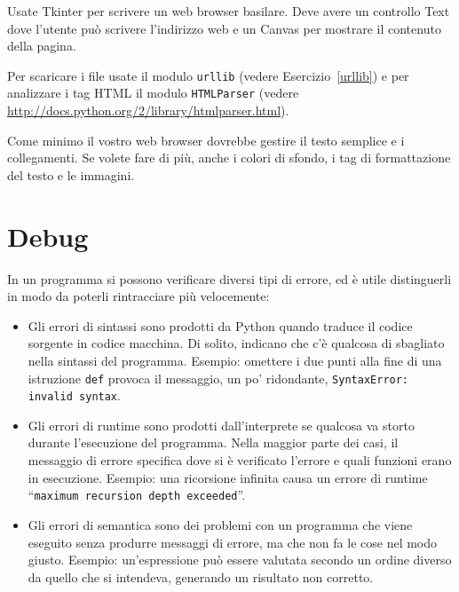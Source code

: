 \documentclass[10pt]{book}
\begin{document}
\vspace{0.2in}
\begin{exercise}

Usate Tkinter per scrivere un web browser basilare. Deve avere un controllo Text dove l'utente può scrivere l'indirizzo web e un Canvas per mostrare il contenuto della pagina.

Per scaricare i file usate il modulo {\tt urllib} (vedere Esercizio~\ref{urllib}) e per analizzare i tag HTML il modulo {\tt HTMLParser} (vedere \url{http://docs.python.org/2/library/htmlparser.html}).

Come minimo il vostro web browser dovrebbe gestire il testo semplice e i collegamenti. Se volete fare di più, anche i colori di sfondo, i tag di formattazione del testo e le immagini.


\end{exercise}



\appendix

\chapter{Debug}

In un programma si possono verificare diversi tipi di errore, ed è utile distinguerli in modo da poterli rintracciare più velocemente:

\begin{itemize}

\item Gli errori di sintassi sono prodotti da Python quando traduce il codice sorgente in codice macchina. Di solito, indicano che c'è qualcosa di sbagliato nella sintassi del programma. Esempio: omettere i due punti alla fine di una istruzione {\tt def} provoca il messaggio, un po' ridondante, {\tt SyntaxError: invalid syntax}.

\item Gli errori di runtime sono prodotti dall'interprete se qualcosa va storto durante l'esecuzione del programma. Nella maggior parte dei casi, il messaggio di errore specifica dove si è verificato l'errore e quali funzioni erano in esecuzione. Esempio: una ricorsione infinita causa un errore di runtime ``{\tt maximum recursion depth exceeded}''.

\item Gli errori di semantica sono dei problemi con un programma che viene eseguito senza produrre messaggi di errore, ma che non fa le cose nel modo giusto. Esempio: un'espressione può essere valutata secondo un ordine diverso da quello che si intendeva, generando un risultato non corretto.

\end{itemize}
\end{document}
